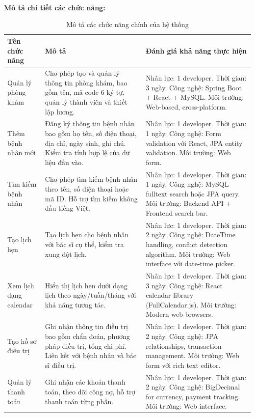 \vspace{1em}

\textbf{Mô tả chi tiết các chức năng:}

\begin{table}[h]
\centering
\caption{Mô tả các chức năng chính của hệ thống}
\scriptsize
\begin{tabular}{|p{3.5cm}|p{5cm}|p{5cm}|}
\hline
\textbf{Tên chức năng} & \textbf{Mô tả} & \textbf{Đánh giá khả năng thực hiện} \\
\hline
Quản lý phòng khám & Cho phép tạo và quản lý thông tin phòng khám, bao gồm tên, mã code 6 ký tự, quản lý thành viên và thiết lập lương. & Nhân lực: 1 developer. Thời gian: 3 ngày. Công nghệ: Spring Boot + React + MySQL. Môi trường: Web-based, cross-platform. \\
\hline
Thêm bệnh nhân mới & Đăng ký thông tin bệnh nhân bao gồm họ tên, số điện thoại, địa chỉ, ngày sinh, ghi chú. Kiểm tra tính hợp lệ của dữ liệu đầu vào. & Nhân lực: 1 developer. Thời gian: 1 ngày. Công nghệ: Form validation với React, JPA entity validation. Môi trường: Web form. \\
\hline
Tìm kiếm bệnh nhân & Cho phép tìm kiếm bệnh nhân theo tên, số điện thoại hoặc mã ID. Hỗ trợ tìm kiếm không dấu tiếng Việt. & Nhân lực: 1 developer. Thời gian: 1 ngày. Công nghệ: MySQL fulltext search hoặc JPA query. Môi trường: Backend API + Frontend search bar. \\
\hline
Tạo lịch hẹn & Tạo lịch hẹn cho bệnh nhân với bác sĩ cụ thể, kiểm tra xung đột lịch. & Nhân lực: 1 developer. Thời gian: 2 ngày. Công nghệ: DateTime handling, conflict detection algorithm. Môi trường: Web interface với date-time picker. \\
\hline
Xem lịch dạng calendar & Hiển thị lịch hẹn dưới dạng lịch theo ngày/tuần/tháng với khả năng tương tác. & Nhân lực: 1 developer. Thời gian: 3 ngày. Công nghệ: React calendar library (FullCalendar.js). Môi trường: Modern web browsers. \\
\hline
Tạo hồ sơ điều trị & Ghi nhận thông tin điều trị bao gồm chẩn đoán, phương pháp điều trị, tổng chi phí. Liên kết với bệnh nhân và bác sĩ điều trị. & Nhân lực: 1 developer. Thời gian: 2 ngày. Công nghệ: JPA relationships, transaction management. Môi trường: Web form với rich text editor. \\
\hline
Quản lý thanh toán & Ghi nhận các khoản thanh toán, theo dõi công nợ, hỗ trợ thanh toán từng phần. & Nhân lực: 1 developer. Thời gian: 2 ngày. Công nghệ: BigDecimal for currency, payment tracking. Môi trường: Web interface. \\

\end{tabular}
\end{table}
